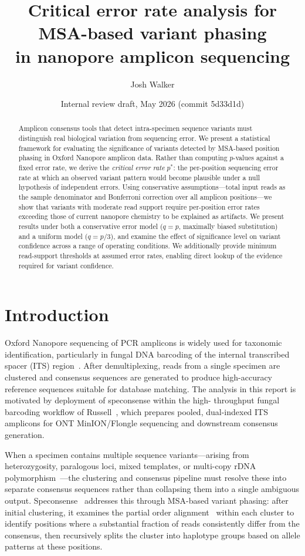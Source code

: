 \documentclass[11pt]{article}
\title{Critical error rate analysis for MSA-based variant phasing\\in nanopore amplicon sequencing}
\author{Josh Walker}
\date{Internal review draft, May 2026 (commit 5d33d1d)}
\begin{document}
\maketitle
\linenumbers

\begin{abstract}
Amplicon consensus tools that detect intra-specimen sequence variants must
distinguish real biological variation from sequencing error. We present a
statistical framework for evaluating the significance of variants detected by
MSA-based position phasing in Oxford Nanopore amplicon data. Rather than
computing $p$-values against a fixed error rate, we derive the \emph{critical
error rate} $p^*$: the per-position sequencing error rate at which an observed
variant pattern would become plausible under a null hypothesis of independent
errors. Using conservative assumptions---total input reads as the sample
denominator and Bonferroni correction over all amplicon positions---we show that
variants with moderate read support require per-position error rates exceeding
those of current nanopore chemistry to be explained as artifacts. We present
results under both a conservative error model ($q = p$, maximally biased
substitution) and a uniform model ($q = p/3$), and examine the effect of
significance level on variant confidence across a range of operating conditions.
We additionally provide minimum read-support thresholds at assumed error rates,
enabling direct lookup of the evidence required for variant confidence.
\end{abstract}

\section{Introduction}

Oxford Nanopore sequencing of PCR amplicons is widely used for taxonomic
identification, particularly in fungal DNA barcoding of the internal transcribed
spacer (ITS) region~\cite{schoch2012}. After demultiplexing, reads from a single
specimen are clustered and consensus sequences are generated to produce
high-accuracy reference sequences suitable for database matching. The analysis
in this report is motivated by deployment of speconsense within the high-
throughput fungal barcoding workflow of Russell~\cite{russell2023}, which
prepares pooled, dual-indexed ITS amplicons for ONT MinION/Flongle sequencing
and downstream consensus generation.

When a specimen contains multiple sequence variants---arising from heterozygosity,
paralogous loci, mixed templates, or multi-copy rDNA polymorphism~\cite{bradshaw2023}---the clustering
and consensus pipeline must resolve these into separate consensus sequences rather
than collapsing them into a single ambiguous output. Speconsense~\cite{speconsense} addresses this
through MSA-based variant phasing: after initial clustering, it examines the
partial order alignment~\cite{lee2003,vaser2017} within each cluster to identify
positions where a substantial fraction of reads consistently differ from the
consensus, then recursively splits the cluster into haplotype groups based on
allele patterns at these positions.
\end{document}
